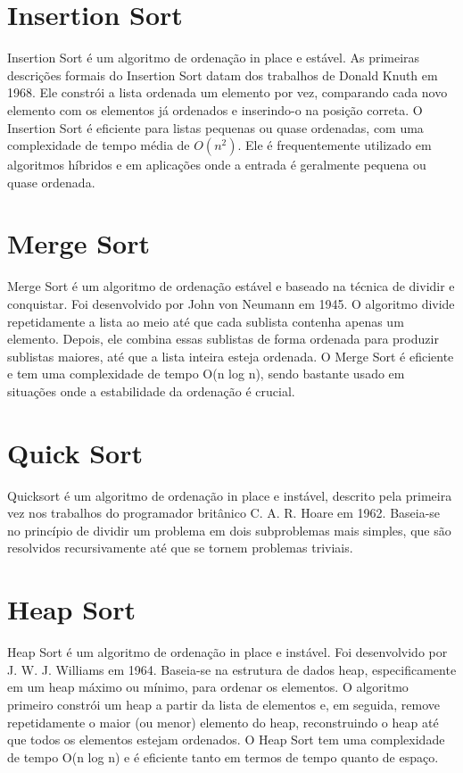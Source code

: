 \documentclass[tcc2]{uftex}
\begin{document}
\section{Insertion Sort}
Insertion Sort é um algoritmo de ordenação in place e estável. As primeiras descrições formais do Insertion Sort datam dos trabalhos de Donald Knuth em 1968. Ele constrói a lista ordenada um elemento por vez, comparando cada novo elemento com os elementos já ordenados e inserindo-o na posição correta. O Insertion Sort é eficiente para listas pequenas ou quase ordenadas, com uma complexidade de tempo média de $O(n^2)$. Ele é frequentemente utilizado em algoritmos híbridos e em aplicações onde a entrada é geralmente pequena ou quase ordenada.

\section{Merge Sort}
Merge Sort é um algoritmo de ordenação estável e baseado na técnica de dividir e conquistar. Foi desenvolvido por John von Neumann em 1945. O algoritmo divide repetidamente a lista ao meio até que cada sublista contenha apenas um elemento. Depois, ele combina essas sublistas de forma ordenada para produzir sublistas maiores, até que a lista inteira esteja ordenada. O Merge Sort é eficiente e tem uma complexidade de tempo O(n log n), sendo bastante usado em situações onde a estabilidade da ordenação é crucial.

\section{Quick Sort}
Quicksort é um algoritmo de ordenação in place e instável, descrito pela primeira vez nos trabalhos do programador britânico C. A. R. Hoare em 1962. Baseia-se no princípio de dividir um problema em dois subproblemas mais simples, que são resolvidos recursivamente até que se tornem problemas triviais.

\section{Heap Sort}
Heap Sort é um algoritmo de ordenação in place e instável. Foi desenvolvido por J. W. J. Williams em 1964. Baseia-se na estrutura de dados heap, especificamente em um heap máximo ou mínimo, para ordenar os elementos. O algoritmo primeiro constrói um heap a partir da lista de elementos e, em seguida, remove repetidamente o maior (ou menor) elemento do heap, reconstruindo o heap até que todos os elementos estejam ordenados. O Heap Sort tem uma complexidade de tempo O(n log n) e é eficiente tanto em termos de tempo quanto de espaço.
\end{document}
